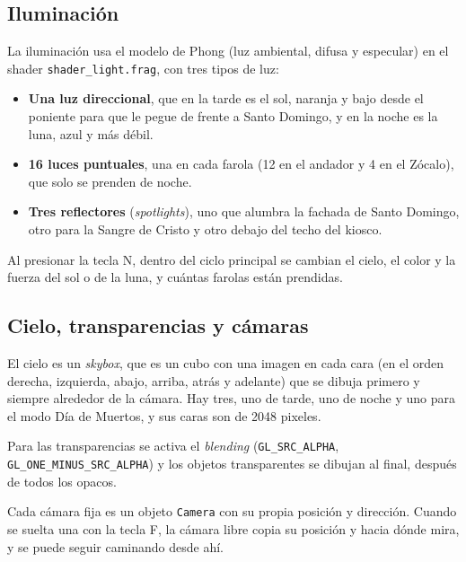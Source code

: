 \documentclass[11pt,a4paper]{article}
\begin{document}
\subsection{Iluminación}

La iluminación usa el modelo de Phong (luz ambiental, difusa y especular) en el shader \texttt{shader\_light.frag}, con tres tipos de luz:

\begin{itemize}
  \item \textbf{Una luz direccional}, que en la tarde es el sol, naranja y bajo desde el poniente para que le pegue de frente a Santo Domingo, y en la noche es la luna, azul y más débil.
  \item \textbf{16 luces puntuales}, una en cada farola (12 en el andador y 4 en el Zócalo), que solo se prenden de noche.
  \item \textbf{Tres reflectores} (\textit{spotlights}), uno que alumbra la fachada de Santo Domingo, otro para la Sangre de Cristo y otro debajo del techo del kiosco.
\end{itemize}

Al presionar la tecla N, dentro del ciclo principal se cambian el cielo, el color y la fuerza del sol o de la luna, y cuántas farolas están prendidas.


\subsection{Cielo, transparencias y cámaras}

El cielo es un \textit{skybox}, que es un cubo con una imagen en cada cara (en el orden derecha, izquierda, abajo, arriba, atrás y adelante) que se dibuja primero y siempre alrededor de la cámara. Hay tres, uno de tarde, uno de noche y uno para el modo Día de Muertos, y sus caras son de 2048 pixeles.

Para las transparencias se activa el \textit{blending} (\texttt{GL\_SRC\_ALPHA}, \texttt{GL\_ONE\_MINUS\_SRC\_ALPHA}) y los objetos transparentes se dibujan al final, después de todos los opacos.

Cada cámara fija es un objeto \texttt{Camera} con su propia posición y dirección. Cuando se suelta una con la tecla F, la cámara libre copia su posición y hacia dónde mira, y se puede seguir caminando desde ahí.
\end{document}
